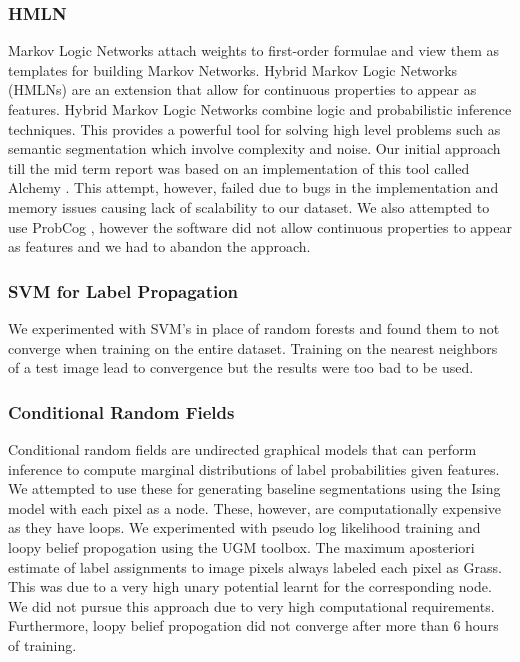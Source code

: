 \documentclass{article} %
\begin{document}
\subsubsection{HMLN}
Markov Logic Networks \cite{Domingos06unifyinglogical} \cite{Richardson06markovlogic} attach weights to first-order formulae and view them as templates for building Markov Networks. Hybrid Markov Logic Networks (HMLNs)\cite{Wang_hybridmarkov} are an extension that allow for continuous properties to appear as features. Hybrid Markov Logic Networks combine logic and probabilistic inference techniques. This provides a powerful tool for solving high level problems such as semantic segmentation which involve complexity and noise. Our initial approach till the mid term report was based on an implementation of this tool called Alchemy \cite{alchemy}. This attempt, however, failed due to bugs in the implementation and memory issues causing lack of scalability to our dataset. We also attempted to use ProbCog \cite{conf/ifiptm/NoorianMF11}, however the software did not allow continuous properties to appear as features and we had to abandon the approach. 

\subsubsection{SVM for Label Propagation}
We experimented with SVM's in place of random forests and found them to not converge when training on the entire dataset. Training on the nearest neighbors of a test image lead to convergence but the results were too bad to be used.

\subsubsection{Conditional Random Fields}
Conditional random fields \cite{lafferty2001conditional} are undirected graphical models that can perform inference to compute marginal distributions of label probabilities given features.
We attempted to use these for generating baseline segmentations using the Ising model with each pixel as a node.
These, however, are computationally expensive as they have loops.
We experimented with pseudo log likelihood training and loopy belief propogation using the UGM toolbox\cite{UGMSoftware}.
The maximum aposteriori estimate of label assignments to image pixels always labeled each pixel as Grass.
This was due to a very high unary potential learnt for the corresponding node. 
We did not pursue this approach due to very high computational requirements.
Furthermore, loopy belief propogation did not converge after more than 6 hours of training.
\end{document}
